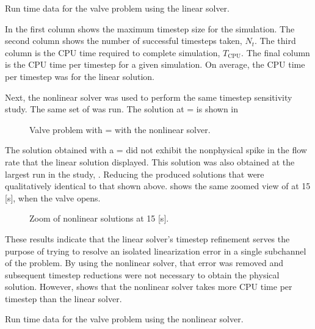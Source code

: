 \begin{table}[h!tb]
\centering
\singlespace

\caption{Run time data for the valve problem using the linear solver.}
\label{tab:valveLinTable}
\end{table}

In  the first column shows the maximum timestep size for the simulation.
The second column shows the number of successful timesteps taken, $N_{t}$.
The third column is the CPU time required to complete simulation, $T_{\text{CPU}}$.
The final column is the CPU time per timestep for a given simulation.
On average, the CPU time per timestep was  for the linear solution.

Next, the nonlinear solver was used to perform the same timestep sensitivity study.
The same set of \dtmax{} was run.
The solution at \dtmax{} =  is shown in 

\begin{figure}[h!tb]
\centering

\caption{Valve problem with \dtmax{} =  with the nonlinear solver.}
\label{fig:valveNln6pt25em02}
\end{figure}

The solution obtained with a \dtmax{} =  did not exhibit the nonphysical spike in the flow rate that the linear solution displayed.
This solution was also obtained at the largest \dt{} run in the study, .
Reducing the \dtmax{} produced solutions that were qualitatively identical to that shown above.
 shows the same zoomed view of at 15 [s], when the valve opens.

\begin{figure}[h!tb]
\centering

\caption{Zoom of nonlinear solutions at 15 [s].}
\label{fig:valveNlnSols}
\end{figure}

These results indicate that the linear solver's timestep refinement serves the purpose of trying to resolve an isolated linearization error in a single subchannel of the problem.
By using the nonlinear solver, that error was removed and subsequent timestep reductions were not necessary to obtain the physical solution.
However,  shows that the nonlinear solver takes more CPU time per timestep than the linear solver.

\begin{table}[h!tb]
\centering
\singlespace

\caption{Run time data for the valve problem using the nonlinear solver.}
\label{tab:valveNlnTable}
\end{table}

